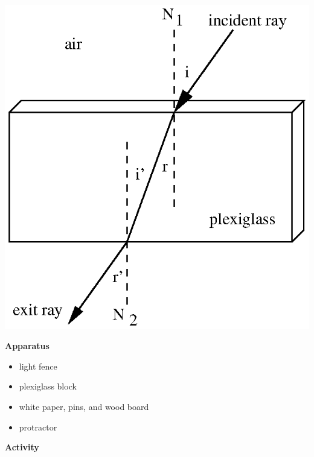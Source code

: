 \vspace{0.3cm}
{\centering \includegraphics{refraction_of_light_fig_1.eps} \par}
\vspace{0.3cm}

\vspace{15mm}
\textbf{Apparatus} 

\begin{itemize}
\item light fence 
\item plexiglass block 
\item white paper, pins, and wood board 
\item protractor
\end{itemize}
\textbf{Activity} 

